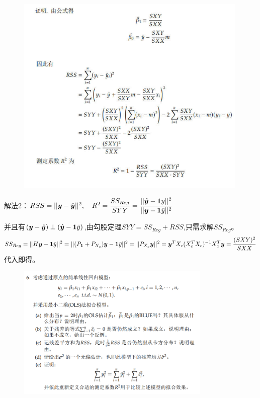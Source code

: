 \documentclass[cn,hazy,green,12pt,normal]{elegantnote}
\numberwithin{equation}{section}
\numberwithin{subsection}{section}
\begin{document}
    \begin{figure}[!htbp]
        \centering
        \includegraphics[width=30em]{image/ex2_plt1.png}
    \end{figure}

    解法2：$RSS=||\bm y-\hat{\bm y} ||^2,\quad R^2=\dfrac{SS_{Reg}}{SYY}=\dfrac{||\hat{\bm y}-\bm 1 \Bar{y}||^2}{||\bm y-\bm 1 \Bar{y}||^2}$

    并且有$(\bm y-\hat{\bm y})\perp (\hat{\bm y}-\bm 1 \Bar{y})$,由勾股定理$SYY=SS_{Reg}+RSS$,只需求解$SS_{Reg}$。
    \[SS_{Reg}=||H \bm y - \bm 1 \Bar{y}||^2=||(P_{\bm 1}+P_{X_c})\bm y-\bm 1 \Bar{y}||^2=||P_{X_c}\bm y||^2=\bm y^TX_c(X_c^TX_c)^{-1}X_c^T\bm y=\dfrac{(SXY)^2}{SXX}\]
    代入即得。
\newpage

\begin{homework}
\end{homework} %

    \begin{figure}[!htbp]
        \centering
        \includegraphics[width=25em]{image/ex2_plt2.png}
    \end{figure}
\end{document}
